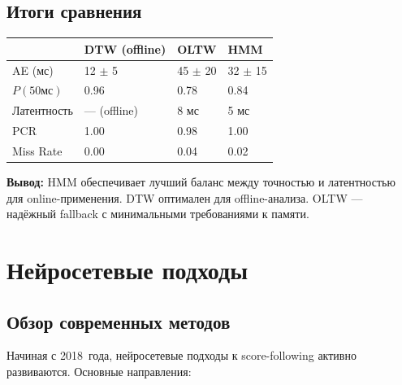 \documentclass[a4paper,11pt]{article}
\begin{document}
\subsection{Итоги сравнения}

\begin{center}
\begin{tcolorbox}[
  enhanced, breakable,
  colback=pastelgreen!10,
  colframe=pastelgreen!50!black,
  sharp corners,
  boxrule=0.6pt,
  title={\bfseries Результаты на синтетическом датасете},
  fonttitle=\bfseries,
  attach boxed title to top left={yshift=-2mm, xshift=5mm},
  boxed title style={colback=pastelgreen!50!black, sharp corners}
]
\begin{tabularx}{\textwidth}{lXXX}
\toprule
& \textbf{DTW (offline)} & \textbf{OLTW} & \textbf{HMM} \\
\midrule
AE (мс)        & 12 $\pm$ 5  & 45 $\pm$ 20  & 32 $\pm$ 15  \\
$P(50\text{мс})$ & 0.96       & 0.78         & 0.84         \\
Латентность    & --- (offline) & 8 мс       & 5 мс         \\
PCR            & 1.00         & 0.98         & 1.00         \\
Miss Rate      & 0.00         & 0.04         & 0.02         \\
\bottomrule
\end{tabularx}

\medskip
\textbf{Вывод:} HMM обеспечивает лучший баланс между точностью и
латентностью для online-применения. DTW оптимален для offline-анализа.
OLTW --- надёжный fallback с минимальными требованиями к памяти.
\end{tcolorbox}
\end{center}


\section{Нейросетевые подходы}
\label{sec:neural}

\subsection{Обзор современных методов}

Начиная с 2018~года, нейросетевые подходы к score-following активно развиваются.
Основные направления:
\end{document}
